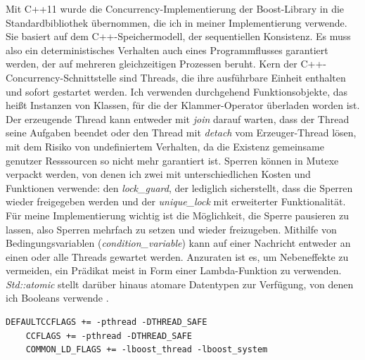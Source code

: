 \documentclass[a4paper,12pt,twoside]{article}
\newcommand{\Fb}[1]{\textit{#1}} %
\begin{document}
Mit C++11 wurde die Concurrency-Implementierung der Boost-Library in die Standardbibliothek übernommen, die ich in meiner Implementierung verwende. Sie basiert auf dem C++-Speichermodell, der sequentiellen Konsistenz. Es muss also ein deterministisches Verhalten auch eines Programmflusses garantiert werden, der auf mehreren gleichzeitigen Prozessen beruht. Kern der C++-Concurrency-Schnittstelle sind Threads, die ihre ausführbare Einheit enthalten und sofort gestartet werden. Ich verwenden durchgehend Funktionsobjekte, das heißt Instanzen von Klassen, für die der Klammer-Operator überladen worden ist. Der erzeugende Thread kann entweder mit \Fb{join} darauf warten, dass der Thread seine Aufgaben beendet oder den Thread mit \Fb{detach} vom Erzeuger-Thread lösen, mit dem Risiko von undefiniertem Verhalten, da die Existenz gemeinsame genutzer Resssourcen so nicht mehr garantiert ist. Sperren können in Mutexe verpackt werden, von denen ich zwei mit unterschiedlichen Kosten und Funktionen verwende: den \Fb{lock\_guard}, der lediglich sicherstellt, dass die Sperren wieder freigegeben werden und der \Fb{unique\_lock} mit erweiterter Funktionalität. Für meine Implementierung wichtig ist die Möglichkeit, die Sperre pausieren zu lassen, also Sperren mehrfach zu setzen und wieder freizugeben. Mithilfe von Bedingungsvariablen (\Fb{condition\_variable}) kann auf einer Nachricht entweder an einen oder alle Threads gewartet werden. Anzuraten ist es, um Nebeneffekte zu vermeiden, ein Prädikat meist in Form einer Lambda-Funktion zu verwenden. \Fb{Std::atomic} stellt darüber hinaus atomare Datentypen zur Verfügung, von denen ich Booleans verwende {\autocite{Grimm2018}}. 

\begin{minipage}{\linewidth}
	\begin{lstlisting}[caption={Flags der MThreaded-Algebra}, label=list:flags]
	DEFAULTCCFLAGS += -pthread -DTHREAD_SAFE
	CCFLAGS += -pthread -DTHREAD_SAFE
	COMMON_LD_FLAGS += -lboost_thread -lboost_system
	\end{lstlisting}
\end{minipage}
\end{document}
